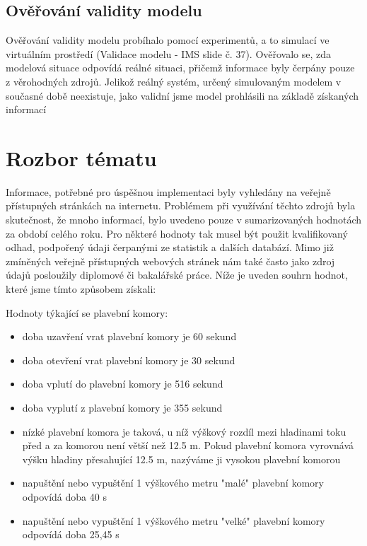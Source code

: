 \documentclass[11pt,a4paper]{article}
\begin{document}
    \subsection{Ověřování validity modelu}

      Ověřování validity modelu probíhalo pomocí experimentů, a to simulací ve
      virtuálním prostředí (Validace modelu - IMS slide č. 37). Ověřovalo se,
      zda modelová situace odpovídá reálné situaci, přičemž informace
      byly čerpány pouze z věrohodných zdrojů. Jelikož reálný systém,
      určený simulovaným modelem v současné době neexistuje, jako validní jsme
      model prohlásili na základě získaných informací

  \section{Rozbor tématu}

    Informace, potřebné pro úspěšnou implementaci byly vyhledány na veřejně
    přístupných stránkách na internetu. Problémem při využívání těchto zdrojů
    byla skutečnost, že mnoho informací, bylo uvedeno pouze v sumarizovaných
    hodnotách za období celého roku.  Pro některé hodnoty tak musel být použit
    kvalifikovaný odhad, podpořený údaji čerpanými ze statistik a dalších
    databází. Mimo již zmíněných veřejně přístupných webových stránek nám také
    často jako zdroj údajů posloužily diplomové či bakalářské práce. Níže je
    uveden souhrn hodnot, které jsme tímto způsobem získali:

    \noindent
    Hodnoty týkající se plavební komory:

    \begin{itemize}
      \item doba uzavření vrat plavební komory je 60 sekund
      \item doba otevření vrat plavební komory je 30 sekund
      \item doba vplutí do plavební komory je 516 sekund
      \item doba vyplutí z plavební komory je 355 sekund
      \item nízké plavební komora je taková, u níž výškový rozdíl mezi
            hladinami toku před a za komorou není větší než 12.5 m.
            Pokud plavební komora vyrovnává výšku hladiny přesahující 12.5 m,
            nazýváme ji vysokou plavební komorou
      \item napuštění nebo vypuštění 1 výškového metru "malé" plavební komory
            odpovídá doba 40 s
      \item napuštění nebo vypuštění 1 výškového metru  "velké" plavební komory
            odpovídá doba 25,45 s
    \end{itemize}
\end{document}
